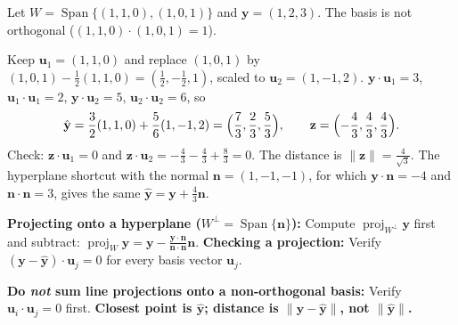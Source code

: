 \documentclass[10pt]{scrartcl}
\newcommand{\vv}[1]{\mathbf{#1}}
\DeclareMathOperator{\spn}{Span}\DeclareMathOperator{\Nul}{Nul}\DeclareMathOperator{\Col}{Col}\DeclareMathOperator{\Row}{Row}\DeclareMathOperator{\tr}{tr}\DeclareMathOperator{\proj}{proj}\DeclareMathOperator{\dist}{dist}
\begin{document}
\begin{example*}
  Let $W=\spn\{(1,1,0),(1,0,1)\}$ and $\vv y=(1,2,3)$. The basis is not orthogonal ($(1,1,0)\cdot(1,0,1)=1$).
  \begin{steps}
    \ii Keep $\vv u_1=(1,1,0)$ and replace $(1,0,1)$ by $(1,0,1)-\frac12(1,1,0)=(\frac12,-\frac12,1)$, scaled to $\vv u_2=(1,-1,2)$.
    \ii $\vv y\cdot\vv u_1=3$, $\vv u_1\cdot\vv u_1=2$, $\vv y\cdot\vv u_2=5$, $\vv u_2\cdot\vv u_2=6$, so
    \[
      \hat{\vv y}=\frac32(1,1,0)+\frac56(1,-1,2)=\Bigl(\frac73,\frac23,\frac53\Bigr),\qquad \vv z=\Bigl(-\frac43,\frac43,\frac43\Bigr).
    \]
    \ii Check: $\vv z\cdot\vv u_1=0$ and $\vv z\cdot\vv u_2=-\frac43-\frac43+\frac83=0$. The distance is $\|\vv z\|=\frac{4}{\sqrt3}$. The hyperplane shortcut with the normal $\vv n=(1,-1,-1)$, for which $\vv y\cdot\vv n=-4$ and $\vv n\cdot\vv n=3$, gives the same $\hat{\vv y}=\vv y+\frac43\vv n$.
  \end{steps}
\end{example*}

\begin{shortcuts}
  \ii \textbf{Projecting onto a hyperplane ($W^\perp=\spn\{\vv n\}$):} Compute $\proj_{W^\perp}\vv y$ first and subtract: $\proj_W\vv y = \vv y - \frac{\vv y\cdot\vv n}{\vv n\cdot\vv n}\vv n$.
  \ii \textbf{Checking a projection:} Verify $(\vv y-\hat{\vv y})\cdot\vv u_j=0$ for every basis vector $\vv u_j$.
\end{shortcuts}

\begin{trapbox}
  \ii \textbf{Do \emph{not} sum line projections onto a non-orthogonal basis:} Verify $\vv u_i\cdot\vv u_j=0$ first.
  \ii \textbf{Closest point is $\hat{\vv y}$; distance is $\|\vv y-\hat{\vv y}\|$, not $\|\hat{\vv y}\|$.}
\end{trapbox}
\end{document}
